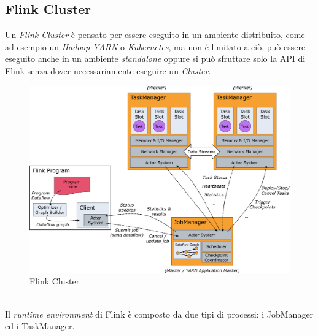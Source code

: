 \subsection{Flink Cluster}
\label{subsec:flink_cluster}
Un \textit{Flink Cluster} è pensato per essere eseguito in un ambiente distribuito, come ad esempio un \textit{Hadoop YARN} o \textit{Kubernetes},
ma non è limitato a ciò, può essere eseguito anche in un ambiente \textit{standalone} oppure si può sfruttare solo la API di Flink senza dover necessariamente eseguire un \textit{Cluster}.
\begin{figure}[htbp]
    \centering
    \includegraphics[width=\textwidth]{images/flink/cluster.jpg}
    \caption{Flink Cluster}
    \label{fig:flink_cluster}
\end{figure}
\\Il \textit{runtime environment} di Flink è composto da due tipi di processi: i JobManager ed i TaskManager.
